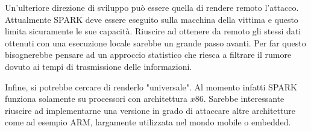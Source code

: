 		Un'ulteriore direzione di sviluppo può essere quella di rendere remoto l'attacco. Attualmente SPARK deve essere eseguito sulla macchina della vittima e questo limita sicuramente le sue capacità. Riuscire ad ottenere da remoto gli stessi dati ottenuti con una esecuzione locale sarebbe un grande passo avanti. Per far questo bisognerebbe pensare ad un approccio statistico che riesca a filtrare il rumore dovuto ai tempi di trasmissione delle informazioni.
		
		Infine, si potrebbe cercare di renderlo "universale". Al momento infatti SPARK funziona solamente su processori con architettura $x86$. Sarebbe interessante riuscire ad implementarne una versione in grado di attaccare altre architetture come ad esempio \ac{ARM}, largamente utilizzata nel mondo mobile o embedded.
	
	
	